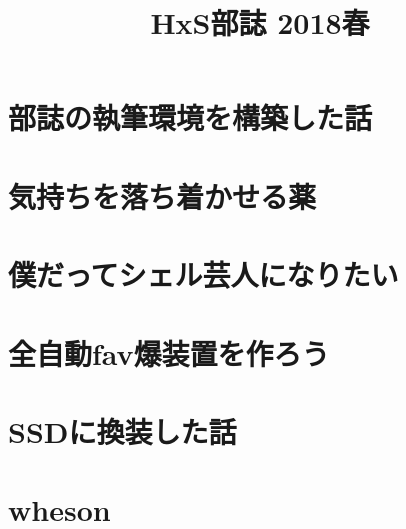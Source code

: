 \documentclass[10.5pt,a4paper]{jsbook}
\title{HxS部誌 2018春}
\date{}
\begin{document}
\maketitle
\tableofcontents

\chapter{部誌の執筆環境を構築した話}


\chapter{気持ちを落ち着かせる薬}


\chapter{僕だってシェル芸人になりたい}


\chapter{全自動fav爆装置を作ろう}


\chapter{SSDに換装した話}


\chapter{wheson}

\end{document}
